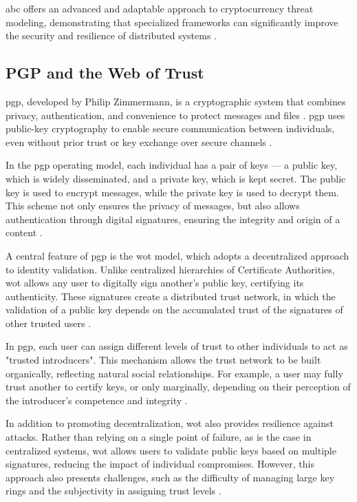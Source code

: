 \gls{abc} offers an advanced and adaptable approach to cryptocurrency threat
modeling, demonstrating that specialized frameworks can significantly improve
the security and resilience of distributed systems \cite{AbcCrypto}.

\subsection{PGP and the Web of Trust}
\label{subsec:pgp_web_of_trust}

\gls{pgp}, developed by Philip Zimmermann, is a cryptographic system that
combines privacy, authentication, and convenience to protect messages and files
\cite{Pgp}. \gls{pgp} uses public-key cryptography to enable secure
communication between individuals, even without prior trust or key exchange over
secure channels \cite{Pgp}.

In the \gls{pgp} operating model, each individual has a pair of keys — a public
key, which is widely disseminated, and a private key, which is kept secret. The
public key is used to encrypt messages, while the private key is used to decrypt
them. This scheme not only ensures the privacy of messages, but also allows
authentication through digital signatures, ensuring the integrity and origin of
a content \cite{Pgp}.

A central feature of \gls{pgp} is the \gls{wot} model, which adopts a
decentralized approach to identity validation. Unlike centralized hierarchies of
Certificate Authorities, \gls{wot} allows any user to digitally sign another's
public key, certifying its authenticity. These signatures create a distributed
trust network, in which the validation of a public key depends on the
accumulated trust of the signatures of other trusted users \cite{Pgp}.

In \gls{pgp}, each user can assign different levels of trust to other
individuals to act as "trusted introducers". This mechanism allows the trust
network to be built organically, reflecting natural social relationships. For
example, a user may fully trust another to certify keys, or only marginally,
depending on their perception of the introducer's competence and integrity
\cite{Pgp}.

In addition to promoting decentralization, \gls{wot} also provides resilience
against \cite{Pgp} attacks. Rather than relying on a single point of failure, as
is the case in centralized systems, \gls{wot} allows users to validate public
keys based on multiple signatures, reducing the impact of individual
compromises. However, this approach also presents challenges, such as the
difficulty of managing large key rings and the subjectivity in assigning trust
levels \cite{Pgp}.

